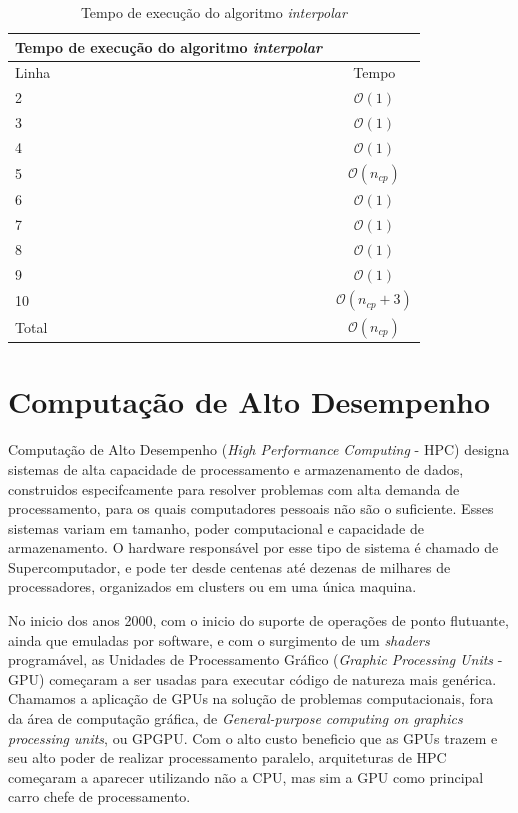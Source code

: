 \begin{table}[H]
\begin{center}
\begin{tabular}{l|c}
\hline
Tempo de execução do algoritmo \textit{interpolar} \\
\hline
Linha&Tempo\\
\hline
2       &$\mathcal{O}(1)$ \\
3       &$\mathcal{O}(1)$ \\
4       &$\mathcal{O}(1)$\\
5       &$\mathcal{O}(n_{cp})$\\
6       &$\mathcal{O}(1)$\\
7       &$\mathcal{O}(1)$\\
8       &$\mathcal{O}(1)$\\
9       &$\mathcal{O}(1)$\\
10      &$\mathcal{O}(n_{cp}+3)$\\
\hline
Total   &$\mathcal{O}(n_{cp})$\\
\hline
\end{tabular}
\caption{Tempo de execução do algoritmo \textit{interpolar}}
\label{table:interpolar}
\end{center}
\end{table}

\section{Computação de Alto Desempenho}\label{GPGPU}

    Computação de Alto Desempenho (\textit{High Performance Computing} - HPC)
designa sistemas de alta capacidade de processamento e armazenamento de dados,
construidos especifcamente para resolver problemas com alta demanda de processamento,
para os quais computadores pessoais não são o suficiente. Esses sistemas variam
em tamanho, poder computacional e capacidade de armazenamento. O hardware
responsável por esse tipo de sistema é chamado de Supercomputador, e pode ter
desde centenas até dezenas de milhares de processadores, organizados em clusters
ou em uma única maquina.

    No inicio dos anos 2000, com o inicio do suporte de operações de ponto flutuante,
ainda que emuladas por software, e com o surgimento de um \textit{shaders} programável,
as Unidades de Processamento Gráfico (\textit{Graphic Processing Units} - GPU)
começaram a ser usadas para executar código de natureza mais genérica.
Chamamos a aplicação de GPUs na solução de problemas computacionais,
fora da área de computação gráfica, de
\textit{General-purpose computing on graphics processing units}, ou GPGPU.
Com o alto custo beneficio que as GPUs trazem e seu alto poder de realizar
processamento paralelo, arquiteturas de HPC começaram a aparecer utilizando não a
CPU, mas sim a GPU como principal carro chefe de processamento.

